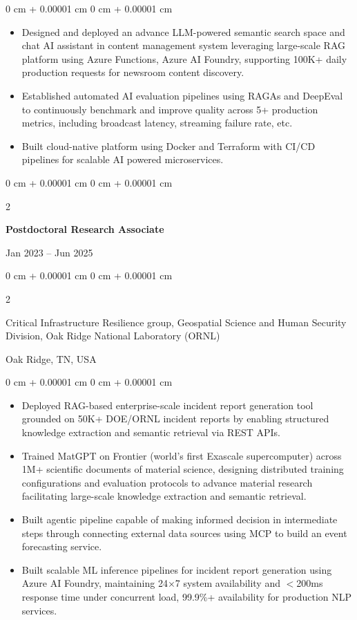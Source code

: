 \documentclass[10pt, letterpaper]{article}
\newenvironment{highlights}{
    \begin{itemize}[
        topsep=0.10 cm,
        parsep=0.10 cm,
        partopsep=0pt,
        itemsep=0pt,
        leftmargin=0 cm + 10pt
    ]
}{
    \end{itemize}
} %
\newenvironment{onecolentry}{
    \begin{adjustwidth}{
        0 cm + 0.00001 cm
    }{
        0 cm + 0.00001 cm
    }
}{
    \end{adjustwidth}
} %
\newenvironment{twocolentry}[2][]{
    \onecolentry
    \def\secondColumn{#2}
    \setcolumnwidth{\fill, 4.5 cm}
    \begin{paracol}{2}
}{
    \switchcolumn \raggedleft \secondColumn
    \end{paracol}
    \endonecolentry
} %
\begin{document}
    \begin{onecolentry}
        \begin{highlights}
            \item Designed and deployed an advance LLM-powered semantic search space and chat AI assistant in content management system leveraging large-scale RAG platform using Azure Functions, Azure AI Foundry, supporting 100K+ daily production requests for newsroom content discovery.
            \item Established automated AI evaluation pipelines using RAGAs and DeepEval to continuously benchmark and improve quality across 5+ production metrics, including broadcast latency, streaming failure rate, etc.
            \item Built cloud-native platform using Docker and Terraform with CI/CD pipelines for scalable AI powered microservices.
        \end{highlights}
    \end{onecolentry}

\vspace{1mm}

    \begin{twocolentry}{Jan 2023 -- Jun 2025}
        \textbf{Postdoctoral Research Associate}
    \end{twocolentry}
    \begin{twocolentry}{Oak Ridge, TN, USA}
        Critical Infrastructure Resilience group, Geospatial Science and Human Security Division, Oak Ridge National Laboratory (ORNL)
    \end{twocolentry}
    \vspace{0.10 cm}
    \begin{onecolentry}
        \begin{highlights}
            \item Deployed RAG-based enterprise-scale incident report generation tool grounded on 50K+ DOE/ORNL incident reports by enabling structured knowledge extraction and semantic retrieval via REST APIs.
            \item Trained MatGPT on Frontier (world’s first Exascale supercomputer) across 1M+ scientific documents of material science, designing distributed training configurations and evaluation protocols to advance material research facilitating large-scale knowledge extraction and semantic retrieval.
            \item Built agentic pipeline capable of making informed decision in intermediate steps through connecting external data sources using MCP to build an event forecasting service. 
            \item Built scalable ML inference pipelines for incident report generation using Azure AI Foundry, maintaining 24×7 system availability and $<$200ms response time under concurrent load, 99.9\%+ availability for production NLP services.
        \end{highlights}
    \end{onecolentry}
\end{document}
